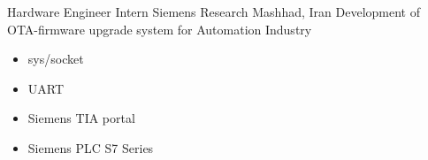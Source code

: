         {Hardware Engineer Intern}
        {Siemens Research}
        {Mashhad, Iran}
        {
        \newline
        Development of OTA-firmware upgrade system for Automation Industry} 
        {
        \begin{itemize}
            \item sys/socket
            \item UART
            \item Siemens TIA portal 
            \item Siemens PLC S7 Series
        \end{itemize}
        }





